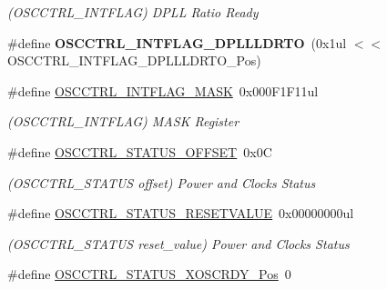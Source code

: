 \begin{DoxyCompactItemize}
\begin{DoxyCompactList}\small\item\em (O\+S\+C\+C\+T\+R\+L\+\_\+\+I\+N\+T\+F\+L\+A\+G) D\+P\+L\+L Ratio Ready \end{DoxyCompactList}\item 
\hypertarget{group___s_a_m_l21___o_s_c_c_t_r_l_ga4426b7ea90e75904bf8d1d48c6eeb010}{}\#define {\bfseries O\+S\+C\+C\+T\+R\+L\+\_\+\+I\+N\+T\+F\+L\+A\+G\+\_\+\+D\+P\+L\+L\+L\+D\+R\+T\+O}~(0x1ul $<$$<$ O\+S\+C\+C\+T\+R\+L\+\_\+\+I\+N\+T\+F\+L\+A\+G\+\_\+\+D\+P\+L\+L\+L\+D\+R\+T\+O\+\_\+\+Pos)\label{group___s_a_m_l21___o_s_c_c_t_r_l_ga4426b7ea90e75904bf8d1d48c6eeb010}

\item 
\hypertarget{group___s_a_m_l21___o_s_c_c_t_r_l_gaedd8a9f620939d751bf1a447933cefa1}{}\#define \hyperlink{group___s_a_m_l21___o_s_c_c_t_r_l_gaedd8a9f620939d751bf1a447933cefa1}{O\+S\+C\+C\+T\+R\+L\+\_\+\+I\+N\+T\+F\+L\+A\+G\+\_\+\+M\+A\+S\+K}~0x000\+F1\+F11ul\label{group___s_a_m_l21___o_s_c_c_t_r_l_gaedd8a9f620939d751bf1a447933cefa1}

\begin{DoxyCompactList}\small\item\em (O\+S\+C\+C\+T\+R\+L\+\_\+\+I\+N\+T\+F\+L\+A\+G) M\+A\+S\+K Register \end{DoxyCompactList}\item 
\hypertarget{group___s_a_m_l21___o_s_c_c_t_r_l_gad7dd78458893930f5f6800c743f745da}{}\#define \hyperlink{group___s_a_m_l21___o_s_c_c_t_r_l_gad7dd78458893930f5f6800c743f745da}{O\+S\+C\+C\+T\+R\+L\+\_\+\+S\+T\+A\+T\+U\+S\+\_\+\+O\+F\+F\+S\+E\+T}~0x0\+C\label{group___s_a_m_l21___o_s_c_c_t_r_l_gad7dd78458893930f5f6800c743f745da}

\begin{DoxyCompactList}\small\item\em (O\+S\+C\+C\+T\+R\+L\+\_\+\+S\+T\+A\+T\+U\+S offset) Power and Clocks Status \end{DoxyCompactList}\item 
\hypertarget{group___s_a_m_l21___o_s_c_c_t_r_l_ga42375dcec180c57773050c0e0cd04b2e}{}\#define \hyperlink{group___s_a_m_l21___o_s_c_c_t_r_l_ga42375dcec180c57773050c0e0cd04b2e}{O\+S\+C\+C\+T\+R\+L\+\_\+\+S\+T\+A\+T\+U\+S\+\_\+\+R\+E\+S\+E\+T\+V\+A\+L\+U\+E}~0x00000000ul\label{group___s_a_m_l21___o_s_c_c_t_r_l_ga42375dcec180c57773050c0e0cd04b2e}

\begin{DoxyCompactList}\small\item\em (O\+S\+C\+C\+T\+R\+L\+\_\+\+S\+T\+A\+T\+U\+S reset\+\_\+value) Power and Clocks Status \end{DoxyCompactList}\item 
\hypertarget{group___s_a_m_l21___o_s_c_c_t_r_l_ga068335c4490f6266cd1b8ac6452c0775}{}\#define \hyperlink{group___s_a_m_l21___o_s_c_c_t_r_l_ga068335c4490f6266cd1b8ac6452c0775}{O\+S\+C\+C\+T\+R\+L\+\_\+\+S\+T\+A\+T\+U\+S\+\_\+\+X\+O\+S\+C\+R\+D\+Y\+\_\+\+Pos}~0\label{group___s_a_m_l21___o_s_c_c_t_r_l_ga068335c4490f6266cd1b8ac6452c0775}


\end{DoxyCompactItemize}
